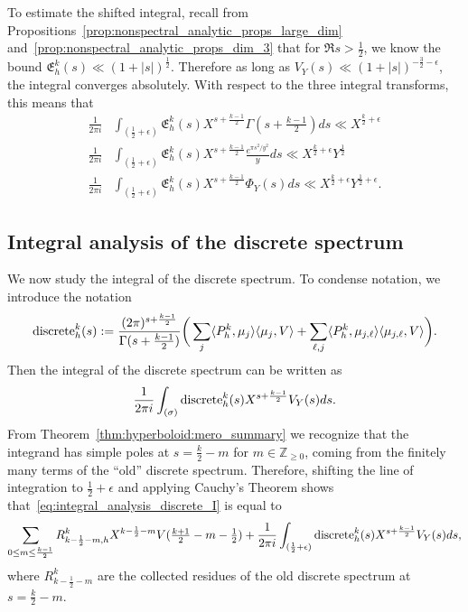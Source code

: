 To estimate the shifted integral, recall from
Propositions~\ref{prop:nonspectral_analytic_props_large_dim}
and~\ref{prop:nonspectral_analytic_props_dim_3} that for $\Re s > \frac{1}{2}$, we know
the bound $\mathfrak{E}_h^k(s) \ll (1 + \lvert s \rvert)^{\frac{1}{2}}$.
Therefore as long as $V_Y(s) \ll (1 + \lvert s \rvert)^{-\frac{3}{2} - \epsilon}$, the
integral converges absolutely.
With respect to the three integral transforms, this means that
\begin{align}
  \frac{1}{2\pi i} &\int_{(\frac{1}{2} + \epsilon)} \mathfrak{E}_h^k(s) X^{s +
  \frac{k-1}{2}} \Gamma(s + \tfrac{k-1}{2}) ds \ll X^{\frac{k}{2} + \epsilon}
  \label{eq:hyperboloid:nonspectral_gamma_integral_bound} \\
  \frac{1}{2\pi i} &\int_{(\frac{1}{2} + \epsilon)} \mathfrak{E}_h^k(s) X^{s +
  \frac{k-1}{2}} \frac{e^{\pi s^2 / y^2}}{y} ds  \ll X^{\frac{k}{2} + \epsilon}
  Y^{\frac{1}{2}} \label{eq:hyperboloid:nonspectral_concentrating_integral_bound}\\
  \frac{1}{2\pi i} &\int_{(\frac{1}{2} + \epsilon)} \mathfrak{E}_h^k(s) X^{s +
  \frac{k-1}{2}} \Phi_Y(s) ds  \ll X^{\frac{k}{2} + \epsilon} Y^{\frac{1}{2}+\epsilon}.
  \label{eq:hyperboloid:nonspectral_compact_integral_bound}
\end{align}



\subsection{Integral analysis of the discrete spectrum}


We now study the integral of the discrete spectrum.
To condense notation, we introduce the notation
\begin{equation}
  \operatorname{discrete}_h^k(s) := \frac{(2\pi)^{s + \frac{k-1}{2}}}{\Gamma(s + \frac{k-1}{2})} \bigg(
  \sum_j \langle P_h^k, \mu_j \rangle \langle \mu_j, V \rangle + \sum_{\ell,j} \langle
P_h^k, \mu_{j,\ell} \rangle \langle \mu_{j, \ell}, V \rangle \bigg).
\end{equation}
Then the integral of the discrete spectrum can be written as
\begin{equation}\label{eq:integral_analysis_discrete_I}
  \frac{1}{2\pi i} \int_{(\sigma)} \operatorname{discrete}_h^k(s) X^{s + \frac{k-1}{2}} V_Y(s) ds.
\end{equation}
From Theorem~\ref{thm:hyperboloid:mero_summary} we recognize that the integrand has simple
poles at $s = \frac{k}{2} - m$ for $m \in \mathbb{Z}_{\geq 0}$, coming from the finitely
many terms of the ``old'' discrete spectrum.
Therefore, shifting the line of integration to $\frac{1}{2} + \epsilon$ and applying
Cauchy's Theorem shows that~\eqref{eq:integral_analysis_discrete_I} is equal to
\begin{equation}
  \sum_{0 \leq m \leq \frac{k-1}{2}} R^k_{k - \frac{1}{2} - m, h} X^{k - \frac{1}{2} - m}
  V(\tfrac{k+1}{2} - m - \tfrac{1}{2}) + \frac{1}{2\pi i} \int_{(\frac{1}{2} + \epsilon)}
  \operatorname{discrete}_h^k(s) X^{s + \frac{k-1}{2}} V_Y(s) ds,
\end{equation}
where $R^k_{k - \frac{1}{2} - m}$ are the collected residues of the old discrete spectrum
at $s = \frac{k}{2} - m$.



